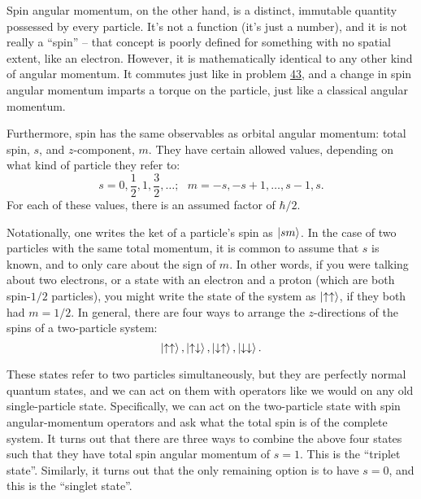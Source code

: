 \documentclass[11pt]{paper}
\begin{document}
Spin angular momentum, on the other hand, is a distinct, immutable quantity possessed by every particle.  It's not a function (it's just a number), and it is not really a ``spin'' \--- that concept is poorly defined for something with no spatial extent, like an electron.  However, it is mathematically identical to any other kind of angular momentum.  It commutes just like in problem \hyperlink{section.43}{43}, and a change in spin angular momentum imparts a torque on the particle, just like a classical angular momentum.

Furthermore, spin has the same observables as orbital angular momentum: total spin, $s$, and $z$-component, $m$.  They have certain allowed values, depending on what kind of particle they refer to:
\begin{equation}
s = 0, \frac{1}{2}, 1, \frac{3}{2},\dots;\text{	}m = -s,-s+1,\dots,s-1,s.
\end{equation}
For each of these values, there is an assumed factor of $\hbar/2$.

Notationally, one writes the ket of a particle's spin as $\ket{sm}$.  In the case of two particles with the same total momentum, it is common to assume that $s$ is known, and to only care about the sign of $m$.  In other words, if you were talking about two electrons, or a state with an electron and a proton (which are both spin-$1/2$ particles), you might write the state of the system as $\ket{\uparrow\uparrow}$, if they both had $m=1/2$.  In general, there are four ways to arrange the $z$-directions of the spins of a two-particle system:
\begin{equation}
\ket{\uparrow\uparrow},\ket{\uparrow\downarrow},\ket{\downarrow\uparrow},\ket{\downarrow\downarrow}.
\end{equation}

These states refer to two particles simultaneously, but they are perfectly normal quantum states, and we can act on them with operators like we would on any old single-particle state.  Specifically, we can act on the two-particle state with spin angular-momentum operators and ask what the total spin is of the complete system.  It turns out that there are three ways to combine the above four states such that they have total spin angular momentum of $s=1$.  This is the ``triplet state''.  Similarly, it turns out that the only remaining option is to have $s=0$, and this is the ``singlet state''.
\end{document}
